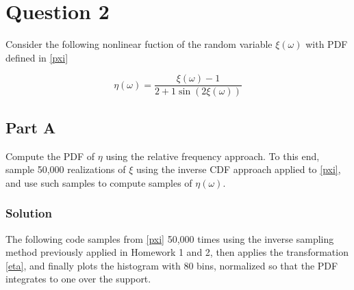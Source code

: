\documentclass[
]{article}
\begin{document}
\section{Question 2}\label{question-2}

Consider the following nonlinear fuction of the random variable
\(\xi(\omega)\) with PDF defined in \eqref{pxi}

\begin{equation}\tag{3}\label{eta}
\eta(\omega) = \frac{\xi(\omega) -1}{2 + 1\sin{(2\xi(\omega))}}
\end{equation}

\subsection{Part A}\label{part-a-1}

Compute the PDF of \(\eta\) using the relative frequency approach. To
this end, sample 50,000 realizations of \(\xi\) using the inverse CDF
approach applied to \eqref{pxi}, and use such samples to compute samples
of \(\eta(\omega)\).

\subsubsection{Solution}\label{solution-3}

The following code samples from \eqref{pxi} 50,000 times using the
inverse sampling method previously applied in Homework 1 and 2, then
applies the transformation \eqref{eta}, and finally plots the histogram
with 80 bins, normalized so that the PDF integrates to one over the
support.
\end{document}
